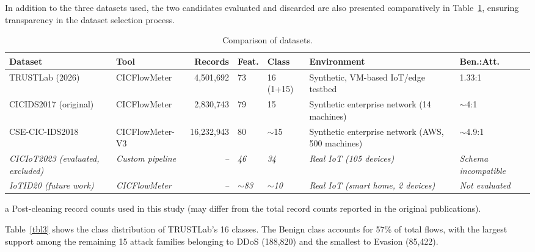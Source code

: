 \documentclass[a4paper,fleqn]{cas-sc}
\begin{document}
In addition to the three datasets used, the two candidates evaluated and discarded are also presented comparatively in Table~\ref{tbl2}, ensuring transparency in the dataset selection process.

\begin{table}[width=\textwidth,cols=7,pos=htbp]
\caption{Comparison of datasets.}
\label{tbl2}
\begin{threeparttable}
\footnotesize
\begin{tabular}{@{}
  p{2.4cm}
  p{1.7cm}
  r
  p{0.9cm}
  p{1.0cm}
  p{2.9cm}
  p{1.5cm}
@{}}
\toprule
\textbf{Dataset} & \textbf{Tool} & \textbf{Records\tnote{a}} & \textbf{Feat.} & \textbf{Class} & \textbf{Environment} & \textbf{Ben.:Att.} \\
\midrule
TRUSTLab (2026) & CICFlowMeter & 4,501,692 & 73 & 16 (1+15) & Synthetic, VM-based IoT/edge testbed & 1.33:1 \\
CICIDS2017 (original) & CICFlowMeter & 2,830,743 & 79 & 15 & Synthetic enterprise network (14 machines) & $\sim$4:1 \\
CSE-CIC-IDS2018 & CICFlowMeter-V3 & 16,232,943 & 80 & $\sim$15 & Synthetic enterprise network (AWS, 500 machines) & $\sim$4.9:1 \\
\textit{CICIoT2023 (evaluated, excluded)} & \textit{Custom pipeline} & \textit{--} & \textit{46} & \textit{34} & \textit{Real IoT (105 devices)} & \textit{Schema incompatible} \\
\textit{IoTID20 (future work)} & \textit{CICFlowMeter} & \textit{--} & \textit{$\sim$83} & \textit{$\sim$10} & \textit{Real IoT (smart home, 2 devices)} & \textit{Not evaluated} \\
\bottomrule
\end{tabular}
\begin{tablenotes}
\footnotesize
\item[a] Post-cleaning record counts used in this study (may differ from the total record counts reported in the original publications).
\end{tablenotes}
\end{threeparttable}
\end{table}

Table~\ref{tbl3} shows the class distribution of TRUSTLab's 16 classes. The Benign class accounts for 57\% of total flows, with the largest support among the remaining 15 attack families belonging to DDoS (188,820) and the smallest to Evasion (85,422).
\end{document}
